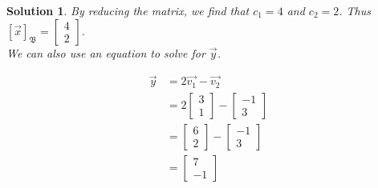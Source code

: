 \documentclass{article}
\newtheorem*{solution}{Solution}
\newcommand{\Coord}[2]{\left[ \vec{#1} \right]_{\mathfrak{#2}}}
\begin{document}
\begin{solution}
By reducing the matrix, we find that $c_{1}  = 4$ and $c_{2} = 2$. Thus $\Coord{x}{B} = \begin{bmatrix} 4 \\ 2 \end{bmatrix}$. \\

We can also use an equation to solve for $\vec{y}$.

\begin{align*}
\vec{y} &= 2 \vec{v_{1}} - \vec{v_{2}} \\
&= 2 \begin{bmatrix}3 \\ 1 \end{bmatrix} - \begin{bmatrix} -1 \\ 3 \end{bmatrix} \\
&= \begin{bmatrix} 6 \\ 2 \end{bmatrix} - \begin{bmatrix} -1 \\ 3 \end{bmatrix} \\
&= \begin{bmatrix} 7 \\ -1 \end{bmatrix}
\end{align*}
\end{solution}
\end{document}
